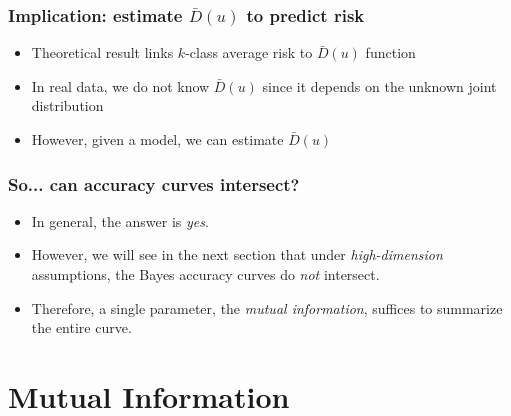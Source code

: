 \documentclass{beamer}
\begin{document}
\begin{frame}
\frametitle{Implication: estimate $\bar{D}(u)$ to predict risk}
\begin{itemize}
\item Theoretical result links $k$-class average risk to $\bar{D}(u)$ function
\item In real data, we do not know $\bar{D}(u)$ since it depends on the unknown joint distribution
\item However, given a model, we can estimate $\bar{D}(u)$
\end{itemize}
\end{frame}

\begin{frame}
\frametitle{So... can accuracy curves intersect?}
\begin{itemize}
\item In general, the answer is \emph{yes}.\pause
\item However, we will see in the next section that under \emph{high-dimension} assumptions, the Bayes accuracy curves do \emph{not} intersect.
\pause
\item Therefore, a single parameter, the \emph{mutual information}, suffices to summarize the entire curve.
\end{itemize}
\end{frame}

\section{Mutual Information}

\begin{frame}
\sectionpage
\end{frame}
\end{document}
